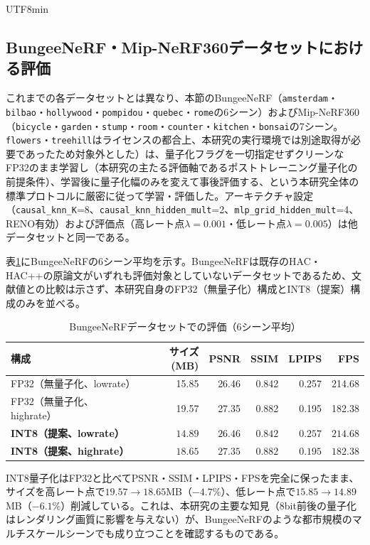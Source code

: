 \documentclass{ieeeaccess}
\begin{document}
\begin{CJK}{UTF8}{min}
\subsection{BungeeNeRF・Mip-NeRF360データセットにおける評価}
\label{sec:bungee-mip360}
これまでの各データセットとは異なり、本節のBungeeNeRF（\texttt{amsterdam}・\texttt{bilbao}・\texttt{hollywood}・\texttt{pompidou}・\texttt{quebec}・\texttt{rome}の6シーン）およびMip-NeRF360（\texttt{bicycle}・\texttt{garden}・\texttt{stump}・\texttt{room}・\texttt{counter}・\texttt{kitchen}・\texttt{bonsai}の7シーン。\texttt{flowers}・\texttt{treehill}はライセンスの都合上、本研究の実行環境では別途取得が必要であったため対象外とした）は、量子化フラグを一切指定せずクリーンなFP32のまま学習し（本研究の主たる評価軸であるポストトレーニング量子化の前提条件）、学習後に量子化幅のみを変えて事後評価する、という本研究全体の標準プロトコルに厳密に従って学習・評価した。アーキテクチャ設定（\texttt{causal\_knn\_K}=8、\texttt{causal\_knn\_hidden\_mult}=2、\texttt{mlp\_grid\_hidden\_mult}=4、RENO有効）および評価点（高レート点$\lambda=0.001$・低レート点$\lambda=0.005$）は他データセットと同一である。

表\ref{tab:bungeenerf}にBungeeNeRFの6シーン平均を示す。BungeeNeRFは既存のHAC・HAC++の原論文がいずれも評価対象としていないデータセットであるため、文献値との比較は示さず、本研究自身のFP32（無量子化）構成とINT8（提案）構成のみを並べる。

\begin{table}[!t]
\renewcommand{\arraystretch}{1.2}
\caption{BungeeNeRFデータセットでの評価（6シーン平均）}
\label{tab:bungeenerf}
\centering
\begin{tabular}{p{4.0cm}rrrrr}
\toprule
構成 & サイズ (MB) & PSNR & SSIM & LPIPS & FPS \\
\midrule
FP32（無量子化、lowrate） & 15.85 & 26.46 & 0.842 & 0.257 & 214.68 \\
FP32（無量子化、highrate） & 19.57 & 27.35 & 0.882 & 0.195 & 182.38 \\
\midrule
\textbf{INT8（提案、lowrate）} & $\mathbf{14.89}$ & $\mathbf{26.46}$ & $\mathbf{0.842}$ & $\mathbf{0.257}$ & $\mathbf{214.68}$ \\
\textbf{INT8（提案、highrate）} & $\mathbf{18.65}$ & $\mathbf{27.35}$ & $\mathbf{0.882}$ & $\mathbf{0.195}$ & $\mathbf{182.38}$ \\
\bottomrule
\end{tabular}
\end{table}

INT8量子化はFP32と比べてPSNR・SSIM・LPIPS・FPSを完全に保ったまま、サイズを高レート点で$19.57\to18.65$MB（$-4.7\%$）、低レート点で$15.85\to14.89$MB（$-6.1\%$）削減している。これは、本研究の主要な知見（8bit前後の量子化はレンダリング画質に影響を与えない）が、BungeeNeRFのような都市規模のマルチスケールシーンでも成り立つことを確認するものである。


\end{CJK}
\end{document}
